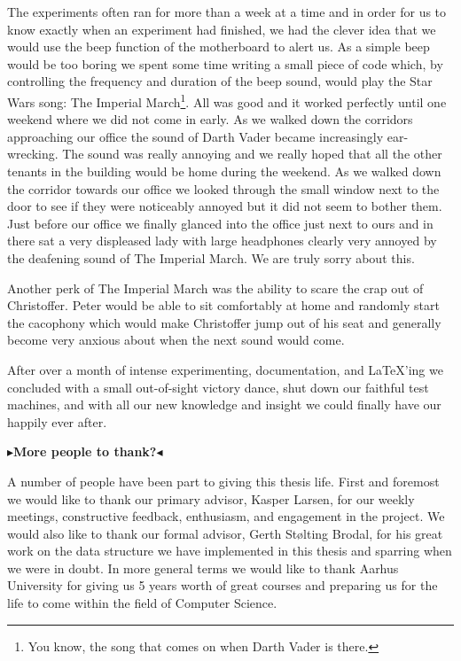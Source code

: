 \documentclass[twoside,11pt,openright]{report}
\newcommand{\todo}[1]{{\color[rgb]{.5,0,0}\textbf{$\blacktriangleright$#1$\blacktriangleleft$}}}
\begin{document}
The experiments often ran for more than a week at a time and in order for us to know exactly when an experiment had finished, we had the clever idea that we would use the beep function of the motherboard to alert us. As a simple beep would be too boring we spent some time writing a small piece of code which, by controlling the frequency and duration of the beep sound, would play the Star Wars song: The Imperial March\footnote{You know, the song that comes on when Darth Vader is there.}. All was good and it worked perfectly until one weekend where we did not come in early. As we walked down the corridors approaching our office the sound of Darth Vader became increasingly ear-wrecking. The sound was really annoying and we really hoped that all the other tenants in the building would be home during the weekend. As we walked down the corridor towards our office we looked through the small window next to the door to see if they were noticeably annoyed but it did not seem to bother them. Just before our office we finally glanced into the office just next to ours and in there sat a very displeased lady with large headphones clearly very annoyed by the deafening sound of The Imperial March. We are truly sorry about this.

Another perk of The Imperial March was the ability to scare the crap out of Christoffer. Peter would be able to sit comfortably at home and randomly start the cacophony which would make Christoffer jump out of his seat and generally become very anxious about when the next sound would come.

After over a month of intense experimenting, documentation, and \LaTeX'ing we concluded with a small out-of-sight victory dance, shut down our faithful test machines, and with all our new knowledge and insight we could finally have our happily ever after.

\todo{More people to thank?}

A number of people have been part to giving this thesis life. First and foremost we would like to thank our primary advisor, Kasper Larsen, for our weekly meetings, constructive feedback, enthusiasm, and engagement in the project.
We would also like to thank our formal advisor, Gerth St\o lting Brodal, for his great work on the data structure we have implemented in this thesis and sparring when we were in doubt.
In more general terms we would like to thank Aarhus University for giving us 5 years worth of great courses and preparing us for the life to come within the field of Computer Science.
\end{document}
